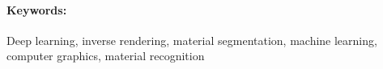 \documentclass[12pt, twoside]{book}
\begin{document}
\paragraph*{Keywords:} Deep learning, inverse rendering, material segmentation, machine learning, computer graphics, material recognition


%
%



\newpage 

\tableofcontents



\newpage 

\listoffigures


\mainmatter


 



















\newpage	

\backmatter

\thispagestyle{empty}
\nocite{*}
\clearpage






%

\end{document}
